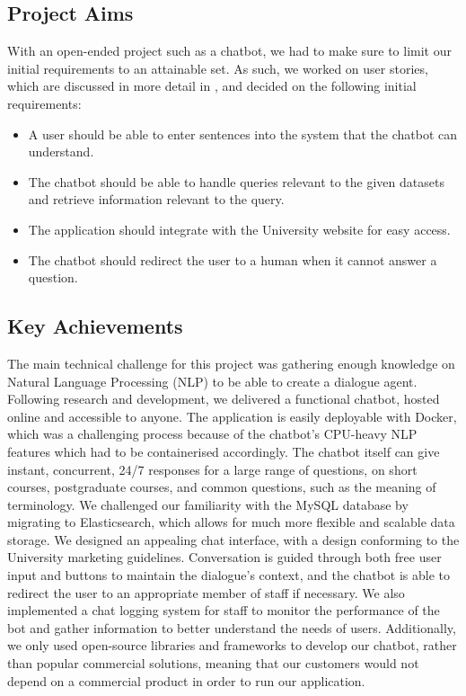 \documentclass{l3proj}
\begin{document}
\subsection{Project Aims}

With an open-ended project such as a chatbot, we had to make sure to limit our initial requirements to an attainable set. As such, we worked on user stories, which are discussed in more detail in , and decided on the following initial requirements:
\begin{itemize}
\item A user should be able to enter sentences into the system that the chatbot can understand.
\item The chatbot should be able to handle queries relevant to the given datasets and retrieve information relevant to the query.
\item The application should integrate with the University website for easy access.
\item The chatbot should redirect the user to a human when it cannot answer a question.
\end{itemize}

\subsection{Key Achievements}

The main technical challenge for this project was gathering enough knowledge on Natural Language Processing (NLP) to be able to create a dialogue agent. Following research and development, we delivered a functional chatbot, hosted online and accessible to anyone. The application is easily deployable with Docker, which was a challenging process because of the chatbot's CPU-heavy NLP features which had to be containerised accordingly. The chatbot itself can give instant, concurrent, 24/7 responses for a large range of questions, on short courses, postgraduate courses, and common questions, such as the meaning of terminology. We challenged our familiarity with the MySQL database by migrating to Elasticsearch, which allows for much more flexible and scalable data storage. We designed an appealing chat interface, with a design conforming to the University marketing guidelines\cite{brandguidelines}. Conversation is guided through both free user input and buttons to maintain the dialogue's context, and the chatbot is able to redirect the user to an appropriate member of staff if necessary. We also implemented a chat logging system for staff to monitor the performance of the bot and gather information to better understand the needs of users. Additionally, we only used open-source libraries and frameworks to develop our chatbot, rather than popular commercial solutions, meaning that our customers would not depend on a commercial product in order to run our application.
\end{document}
